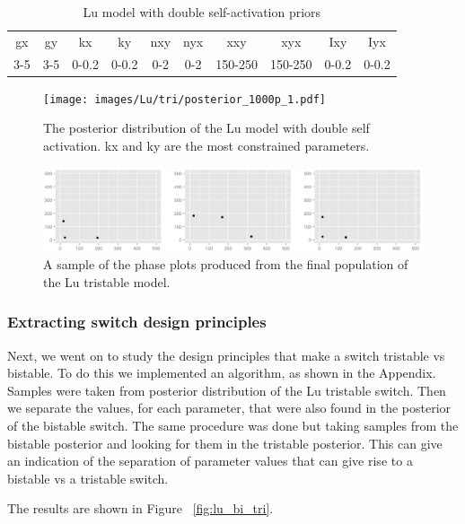\clearpage
\begin{table}[p]
\centering
\caption{Lu model with double self-activation priors}
\label{tab:lu_dp_pr}
\begin{tabular}{cccccccccc}
gx    & gy    & kx    & ky    & nxy & nyx & xxy     & xyx     & Ixy   & Iyx \\
3-5 & 3-5 & 0-0.2 & 0-0.2 & 0-2 & 0-2 & 150-250 & 150-250 & 0-0.2 &   0-0.2 
\end{tabular}
\end{table}

\begin{figure}[p]
\centering
\texttt{[image: images/Lu/tri/posterior\_1000p\_1.pdf]}
\caption{The posterior distribution of the Lu model with double self activation. kx and ky are the most constrained parameters.}
\label{fig:lu_tristable}
\end{figure}


\begin{figure}[p]
\centering
\includegraphics[scale=0.4]{images/Lu/tri/phase_plots.png}
\caption{A sample of the phase plots produced from the final population of the Lu tristable model.}
\label{fig:lu_tri_phase_pl}
\end{figure}


\subsubsection{Extracting switch design principles}
Next, we went on to study the design principles that make a switch tristable vs bistable. To do this we implemented an algorithm, as shown in the Appendix. Samples were taken from posterior distribution of the Lu tristable switch. Then we separate the values, for each parameter, that were also found in the posterior of the bistable switch. The same procedure was done but taking samples from the bistable posterior and looking for them in the tristable posterior. This can give an indication of the separation of parameter values that can give rise to a bistable vs a tristable switch. 

The results are shown in Figure ~\ref{fig:lu_bi_tri}.

